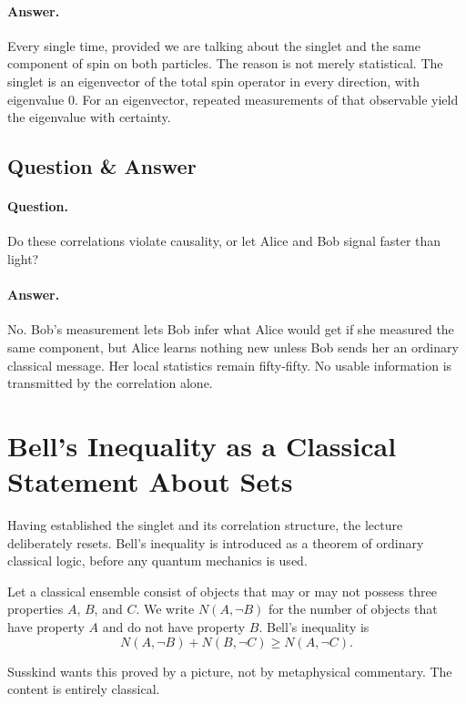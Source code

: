 \paragraph{Answer.} Every single time, provided we are talking about the singlet and the same component of spin on both particles. The reason is not merely statistical. The singlet is an eigenvector of the total spin operator in every direction, with eigenvalue \(0\). For an eigenvector, repeated measurements of that observable yield the eigenvalue with certainty.

\subsection{Question \& Answer}

\paragraph{Question.} Do these correlations violate causality, or let Alice and Bob signal faster than light?

\paragraph{Answer.} No. Bob's measurement lets Bob infer what Alice would get if she measured the same component, but Alice learns nothing new unless Bob sends her an ordinary classical message. Her local statistics remain fifty-fifty. No usable information is transmitted by the correlation alone.

\section{Bell's Inequality as a Classical Statement About Sets}

Having established the singlet and its correlation structure, the lecture deliberately resets. Bell's inequality is introduced as a theorem of ordinary classical logic, before any quantum mechanics is used.

Let a classical ensemble consist of objects that may or may not possess three properties \(A\), \(B\), and \(C\). We write \(N(A,\neg B)\) for the number of objects that have property \(A\) and do not have property \(B\). Bell's inequality is
\begin{equation}
N(A,\neg B)+N(B,\neg C)\ge N(A,\neg C).
\end{equation}

Susskind wants this proved by a picture, not by metaphysical commentary. The content is entirely classical.

